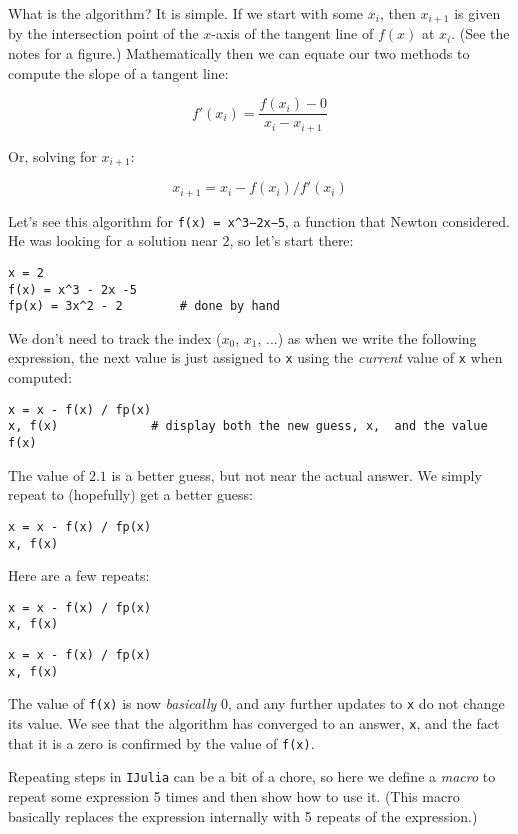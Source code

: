 \documentclass[12pt]{article}
\begin{document}
What is the algorithm? It is simple. If we start with some $x_i$, then
$x_{i+1}$ is given by the intersection point of the $x$-axis of the
tangent line of $f(x)$ at $x_i$. (See the notes for a figure.)
Mathematically then we can equate our two methods to compute the slope
of a tangent line:

\[
f'(x_i) = \frac{f(x_i) - 0}{x_i - x_{i+1}}
\]

Or, solving for $x_{i+1}$:

\[
x_{i+1} = x_i - f(x_i)/f'(x_i)
\]

Let's see this algorithm for \texttt{f(x) = x\^{}3−2x−5}, a function
that Newton considered. He was looking for a solution near $2$, so let's
start there:



\begin{verbatim}
x = 2
f(x) = x^3 - 2x -5
fp(x) = 3x^2 - 2        # done by hand
\end{verbatim}
We don't need to track the index ($x_0$, $x_1$, ...) as when we write
the following expression, the next value is just assigned to \texttt{x}
using the \emph{current} value of \texttt{x} when computed:



\begin{verbatim}
x = x - f(x) / fp(x)
x, f(x)             # display both the new guess, x,  and the value f(x)
\end{verbatim}
The value of $2.1$ is a better guess, but not near the actual answer. We
simply repeat to (hopefully) get a better guess:



\begin{verbatim}
x = x - f(x) / fp(x)
x, f(x)
\end{verbatim}
Here are a few repeats:



\begin{verbatim}
x = x - f(x) / fp(x)
x, f(x)
\end{verbatim}


\begin{verbatim}
x = x - f(x) / fp(x)
x, f(x)
\end{verbatim}
The value of \texttt{f(x)} is now \emph{basically} 0, and any further
updates to \texttt{x} do not change its value. We see that the algorithm
has converged to an answer, \texttt{x}, and the fact that it is a zero
is confirmed by the value of \texttt{f(x)}.

Repeating steps in \texttt{IJulia} can be a bit of a chore, so here we
define a \emph{macro} to repeat some expression 5 times and then show
how to use it. (This macro basically replaces the expression internally
with 5 repeats of the expression.)
\end{document}
